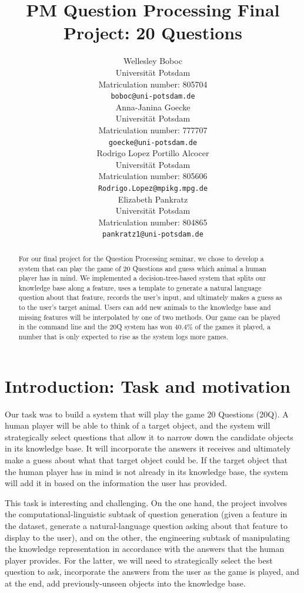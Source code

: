 \documentclass[11pt,a4paper]{article}
\title{PM Question Processing Final Project: 20 Questions}
\author{Wellesley Boboc \\
Universit{\"a}t Potsdam \\
Matriculation number: 805704 \\
\texttt{boboc@uni-potsdam.de} \\\And
Anna-Janina Goecke \\
Universit{\"a}t Potsdam \\
Matriculation number: 777707 \\
\texttt{goecke@uni-potsdam.de} \\\AND
Rodrigo Lopez Portillo Alcocer \\
Universit{\"a}t Potsdam \\
Matriculation number: 805606 \\
\texttt{Rodrigo.Lopez@mpikg.mpg.de} \\\And
Elizabeth Pankratz \\
Universit{\"a}t Potsdam \\
Matriculation number: 804865 \\
\texttt{pankratz1@uni-potsdam.de} \\}
\date{}
\begin{document}
\maketitle

\begin{abstract}
For our final project for the Question Processing seminar, we chose to develop a system that can play the game of 20 Questions and guess which animal a human player has in mind. We implemented a decision-tree-based system that splits our knowledge base along a feature, uses a template to generate a natural language question about that feature, records the user's input, and ultimately makes a guess as to the user's target animal. Users can add new animals to the knowledge base and missing features will be interpolated by one of two methods. Our game can be played in the command line and the 20Q system has won 40.4\% of the games it played, a number that is only expected to rise as the system logs more games.
\end{abstract}

\section{Introduction: Task and motivation}
\label{sec:intro}

Our task was to build a system that will play the game 20 Questions (20Q).
A human player will be able to think of a target object, and the system will strategically select questions that allow it to narrow down the candidate objects in its knowledge base.
It will incorporate the answers it receives and ultimately make a guess about what that target object could be.
If the target object that the human player has in mind is not already in its knowledge base, the system will add it in based on the information the user has provided.

This task is interesting and challenging.
On the one hand, the project involves the computational-linguistic subtask of question generation (given a feature in the dataset, generate a natural-language question asking about that feature to display to the user), and on the other, the engineering subtask of manipulating the knowledge representation in accordance with the answers that the human player provides.
For the latter, we will need to strategically select the best question to ask, incorporate the answers from the user as the game is played, and at the end, add previously-unseen objects into the knowledge base.
\end{document}

